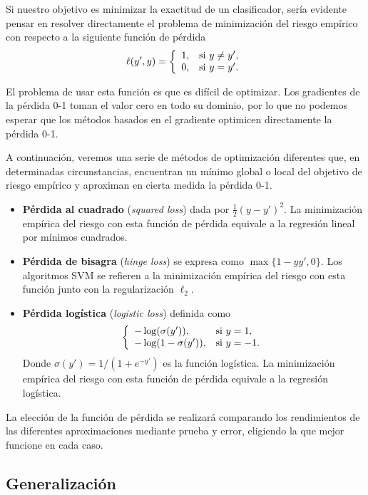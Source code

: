 \documentclass[oneside,openright,titlepage,numbers=noenddot,openany,headinclude,footinclude=true,
cleardoublepage=empty,abstractoff,BCOR=5mm,paper=a4,fontsize=12pt,main=spanish]{scrreprt}
\begin{document}
Si nuestro objetivo es minimizar la exactitud de un clasificador, sería evidente pensar en resolver directamente el problema de minimización del riesgo empírico con respecto a la siguiente función de pérdida $$\ell(y',y)=\left \{
\begin{array}{l l}
1, & \mbox{si } y\neq y', \\
0, & \mbox{si } y=y'.
\end{array}
\right.$$

El problema de usar esta función es que es difícil de optimizar. Los gradientes de la pérdida 0-1 toman el valor cero en todo su dominio, por lo que no podemos esperar que los métodos basados en el gradiente optimicen directamente la pérdida 0-1.

A continuación, veremos una serie de métodos de optimización diferentes que, en determinadas circunstancias, encuentran un mínimo global o local del objetivo de riesgo empírico y aproximan en cierta medida la pérdida 0-1.

\begin{itemize}
    \item \textbf{Pérdida al cuadrado} (\textit{squared loss}) dada por $\frac{1}{2}(y-y')^2$. La minimización empírica del riesgo con esta función de pérdida equivale a la regresión lineal por mínimos cuadrados. 
    \item \textbf{Pérdida de bisagra} (\textit{hinge loss}) se expresa como $\max\{1-yy',0\}$. Los algoritmos SVM se refieren a la minimización empírica del riesgo con esta función junto con la regularización $\ell_2$.
    \clearpage
    \item \textbf{Pérdida logística} (\textit{logistic loss}) definida como $$\left \{
    \begin{array}{l l}
    -\log(\sigma(y')), & \mbox{si } y=1, \\
    -\log(1-\sigma(y')), & \mbox{si } y=-1.
    \end{array}
    \right.$$
    Donde $\sigma(y')=1/(1+e^{-y'})$ es la función logística. La minimización empírica del riesgo con esta función de pérdida equivale a la regresión logística. 
\end{itemize}

La elección de la función de pérdida se realizará comparando los rendimientos de las diferentes aproximaciones mediante prueba y error, eligiendo la que mejor funcione en cada caso.

\subsection{Generalización}
\end{document}
